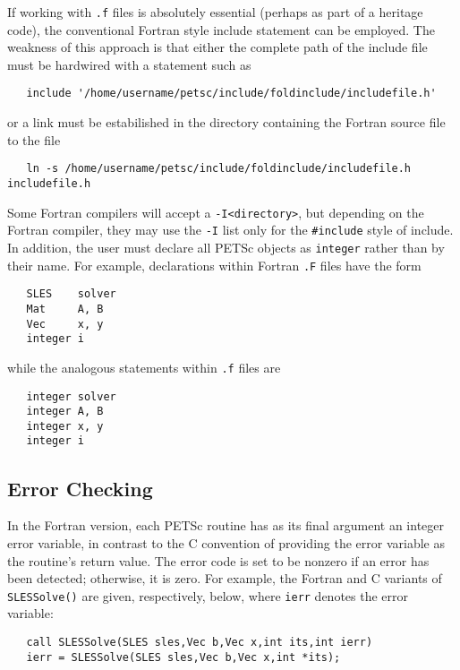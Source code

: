 \medskip

If working with {\tt .f} files is absolutely essential (perhaps as
part of a heritage code), the conventional Fortran style include
statement can be employed.  The weakness of this approach is that either the
complete path of the include file must be hardwired with a statement such as
\begin{verbatim}
   include '/home/username/petsc/include/foldinclude/includefile.h'
\end{verbatim}
or a link must be estabilished in the directory containing the Fortran source
file to the file
\begin{verbatim}
   ln -s /home/username/petsc/include/foldinclude/includefile.h includefile.h
\end{verbatim}
Some Fortran compilers will accept a {\tt -I<directory>}, but depending on the
Fortran compiler, they may use the {\tt -I} list only for the {\tt \#include}
style of include.
In addition, the user must declare all PETSc objects as {\tt integer} 
rather than by their name. For example, declarations within Fortran
{\tt .F} files have the form
\begin{verbatim}
   SLES    solver
   Mat     A, B
   Vec     x, y
   integer i
\end{verbatim}
while the analogous statements within {\tt .f} files are
\begin{verbatim}
   integer solver
   integer A, B
   integer x, y
   integer i
\end{verbatim}

\subsection{Error Checking}
\label{sec:fortran_errors}

In the Fortran version, each PETSc routine has as its final argument
an integer error variable, in contrast to the C convention of
providing the error variable as the routine's return value.  The error
code is set to be nonzero if an error has been detected; otherwise, it
is zero.  For example, the Fortran and C variants of {\tt SLESSolve()} are
given, respectively, below, where {\tt ierr} denotes the error variable:
\begin{verbatim}
   call SLESSolve(SLES sles,Vec b,Vec x,int its,int ierr)
   ierr = SLESSolve(SLES sles,Vec b,Vec x,int *its);
\end{verbatim}

